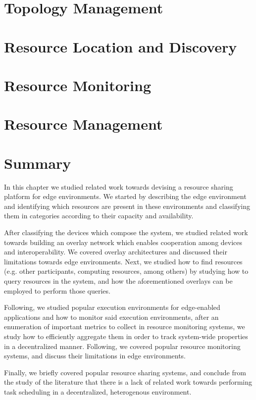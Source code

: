 \section{Topology Management} \label{sec:topology_management} 

\section{Resource Location and Discovery} \label{sec:res_location} 

\section{Resource Monitoring} \label{sec:res_monitoring} 

\section{Resource Management} \label{sec:res_management} 

\section{Summary}

In this chapter we studied related work towards devising a resource sharing platform for edge environments. We started by describing the edge environment and identifying which resources are present in these environments and classifying them in categories according to their capacity and availability. 

After classifying the devices which compose the system, we studied related work towards building an overlay network which enables cooperation among devices and interoperability. We covered overlay architectures and discussed their limitations towards edge environments. Next, we studied how to find resources (e.g. other participants, computing resources, among others) by studying how to query resources in the system, and how the aforementioned overlays can be employed to perform those queries.

Following, we studied popular execution environments for edge-enabled applications and how to monitor said execution environments, after an enumeration of important metrics to collect in resource monitoring systems, we study how to efficiently aggregate them in order to track system-wide properties in a decentralized manner. Following, we covered popular resource monitoring systems, and discuss their limitations in edge environments. 

Finally, we briefly covered popular resource sharing systems, and conclude from the study of the literature that there is a lack of related work towards performing task scheduling in a decentralized, heterogenous environment. 